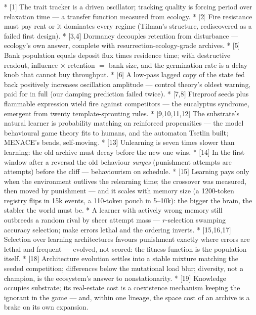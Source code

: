 \begitems
*  [1] The trait
tracker is a driven oscillator; tracking quality is forcing period
over relaxation time --- a transfer function measured from ecology.
*  [2] Fire
resistance must pay rent or it dominates every regime (Tilman's
structure, rediscovered as a failed first design).
*  [3,4] Dormancy
decouples retention from disturbance --- ecology's own answer,
complete with resurrection-ecology-grade archives.
*  [5] Bank population equals deposit flux times
residence time; with destructive readout, influence $\times$
retention $=$ bank size, and the germination rate is a delay knob
that cannot buy throughput.
*  [6] A low-pass lagged copy of
the state fed back positively increases oscillation amplitude ---
control theory's oldest warning, paid for in full (our damping
prediction failed twice).
*  [7,8] Fireproof seeds plus
flammable expression wield fire against competitors --- the
eucalyptus syndrome, emergent from twenty template-sprouting rules.
* 
[9,10,11,12] The
substrate's natural learner is probability matching on reinforced
propensities --- the model behavioural game theory fits to humans,
and the automaton Tsetlin built; MENACE's beads, self-moving.
*  [13] Unlearning is seven times slower
than learning: the old archive must decay before the new one wins.
*  [14] In the first window after a reversal
the old behaviour {\it surges} (punishment attempts are attempts)
before the cliff --- behaviourism on schedule.
*  [15] Learning pays only when the
environment outlives the relearning time; the crossover was
measured, then moved by punishment --- and it scales with memory
size (a 1200-token registry flips in 15k events, a 110-token pouch
in 5--10k): the bigger the brain, the stabler the world must be.
*  A
learner with actively wrong memory still outbreeds a random rival by
sheer attempt mass --- $r$-selection swamping accuracy selection;
make errors lethal and the ordering inverts.
*  [15,16,17] Selection
over learning architectures favours punishment exactly where errors
are lethal and frequent --- evolved, not scored: the fitness
function is the population itself.
*  [18] Architecture
evolution
settles into a stable mixture matching the seeded competition;
differences below the mutational load blur; diversity, not a
champion, is the ecosystem's answer to nonstationarity.
*  [19] Knowledge occupies
substrate; its real-estate cost is a coexistence mechanism keeping
the ignorant in the game --- and, within one lineage, the space cost
of an archive is a brake on its own expansion.
\enditems

